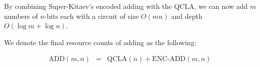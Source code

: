 

By combining Super-Kitaev's encoded adding with the QCLA, we can now
add $m$ numbers of $n$-bits each with a circuit of size $O(mn)$ and
depth $O(\log m + \log n)$.

We denote the final resource counts of adding as the following:

\begin{eqnarray*}
\text{ADD}(m, n) & = & \text{QCLA}(n) + \text{ENC-ADD}(m,n)\\
\end{eqnarray*}